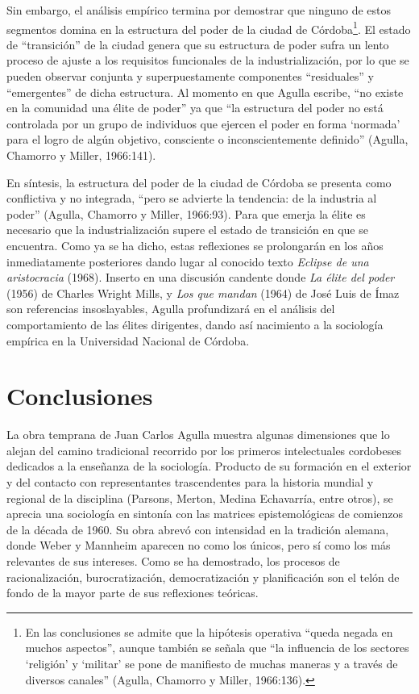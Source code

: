 Sin embargo, el análisis empírico termina por demostrar que ninguno de estos segmentos domina en la estructura del poder de la ciudad de Córdoba\footnote{En las conclusiones se admite que la hipótesis operativa ``queda negada en muchos aspectos'', aunque también se señala que ``la influencia de los sectores `religión' y `militar' se pone de manifiesto de muchas maneras y a través de diversos canales'' (Agulla, Chamorro y Miller, 1966:136).}. El estado de ``transición'' de la ciudad genera que su estructura de poder sufra un lento proceso de ajuste a los requisitos funcionales de la industrialización, por lo que se pueden observar conjunta y superpuestamente componentes ``residuales'' y ``emergentes'' de dicha estructura. Al momento en que Agulla escribe, ``no existe en la comunidad una élite de poder'' ya que ``la estructura del poder no está controlada por un grupo de individuos que ejercen el poder en forma `normada' para el logro de algún objetivo, consciente o inconscientemente definido'' (Agulla, Chamorro y Miller, 1966:141).

En síntesis, la estructura del poder de la ciudad de Córdoba se presenta como conflictiva y no integrada, ``pero se advierte la tendencia: de la industria al poder'' (Agulla, Chamorro y Miller, 1966:93). Para que emerja la élite es necesario que la industrialización supere el estado de transición en que se encuentra. Como ya se ha dicho, estas reflexiones se prolongarán en los años inmediatamente posteriores dando lugar al conocido texto \emph{Eclipse de una aristocracia} (1968). Inserto en una discusión candente donde \emph{La élite del poder} (1956) de Charles Wright Mills, y \emph{Los que mandan} (1964) de José Luis de Ímaz son referencias insoslayables, Agulla profundizará en el análisis del comportamiento de las élites dirigentes, dando así nacimiento a la sociología empírica en la Universidad Nacional de Córdoba.

\section{Conclusiones}

La obra temprana de Juan Carlos Agulla muestra algunas dimensiones que lo alejan del camino tradicional recorrido por los primeros intelectuales cordobeses dedicados a la enseñanza de la sociología. Producto de su formación en el exterior y del contacto con representantes trascendentes para la historia mundial y regional de la disciplina (Parsons, Merton, Medina Echavarría, entre otros), se aprecia una sociología en sintonía con las matrices epistemológicas de comienzos de la década de 1960. Su obra abrevó con intensidad en la tradición alemana, donde Weber y Mannheim aparecen no como los únicos, pero sí como los más relevantes de sus intereses. Como se ha demostrado, los procesos de racionalización, burocratización, democratización y planificación son el telón de fondo de la mayor parte de sus reflexiones teóricas.

